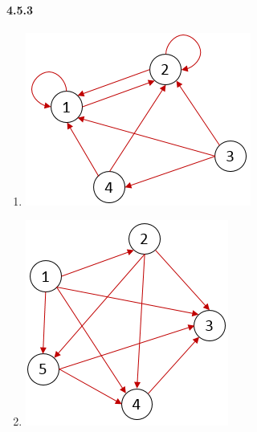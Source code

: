 \documentclass[11pt, letterpaper, twocolumn, fleqn]{article}
\begin{document}
\begin{enumerate}
        \end{enumerate}
    
    \paragraph{4.5.3}
        \begin{enumerate}
            \item \includegraphics[scale=.7]{453a}
            \item \includegraphics[scale=.7]{453b}
        \end{enumerate}
    
\end{document}
